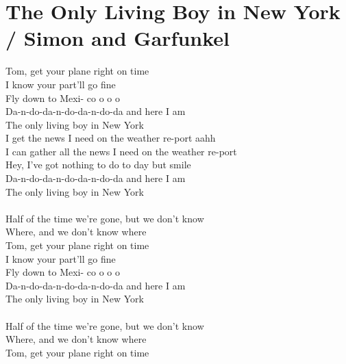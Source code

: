 \section{The Only Living Boy in New York / Simon and Garfunkel}\label{sec:theonlylivingboyinnewyork}

  \Amajor
  \Bminor
  \DmajorEasy
  \Eseven
  \FsharpMajor
  
  
 Tom, get your plane right on  time\\
 I know your part'll go  fine\\
 Fly down to Mexi- co o o  o\\
 Da-n-do-da-n-do-da-n-do-da and  here I am\\
The  only living boy in New  York\\
 I get the news I need on the weather re-port aahh\\
I can  gather all the news I need on the weather re-port\\
 Hey, I've got nothing to  do to  day but  smile\\
Da-n-do-da-n-do-da-n-do-da and  here I am\\
The  only living boy in New  York\\
\\
 Half of the time we're  gone, but we don't know\\
 Where, and we don't know  where\\
 Tom, get your plane right on  time\\
 I know your part'll go  fine\\
 Fly down to Mexi- co o o  o\\
 Da-n-do-da-n-do-da-n-do-da and  here I am\\
The  only living boy in New  York\\
\\
 Half of the time we're  gone, but we don't know\\
 Where, and we don't know  where\\
 Tom, get your plane right on  time\\
